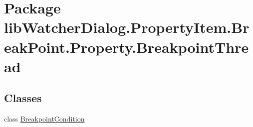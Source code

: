 \hypertarget{namespacelib_watcher_dialog_1_1_property_item_1_1_break_point_1_1_property_1_1_breakpoint_thread}{\section{Package lib\+Watcher\+Dialog.\+Property\+Item.\+Break\+Point.\+Property.\+Breakpoint\+Thread}
\label{namespacelib_watcher_dialog_1_1_property_item_1_1_break_point_1_1_property_1_1_breakpoint_thread}
}
\subsection*{Classes}
\begin{DoxyCompactItemize}
\item 
class \hyperlink{classlib_watcher_dialog_1_1_property_item_1_1_break_point_1_1_property_1_1_breakpoint_thread_1_1_breakpoint_condition}{Breakpoint\+Condition}
\end{DoxyCompactItemize}
